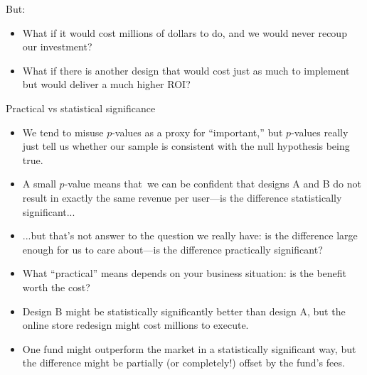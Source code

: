 \documentclass{beamer}\usepackage[]{graphicx}\usepackage[]{color}
\begin{document}
\begin{darkframes}
    \begin{frame}{But:}
      \begin{itemize}[<+->]
        \item What if it would cost millions of dollars to do, and we would never recoup our investment?
        \item What if there is another design that would cost just as much to implement but would deliver a much higher ROI?
      \end{itemize}
    \end{frame}

    \begin{frame}{Practical vs statistical significance}
      \begin{itemize}[<+->]
        \item We tend to misuse $p$-values as a proxy for ``important,'' but $p$-values really just tell us whether our sample is consistent with the null hypothesis being true.
        \item A small $p$-value means that we can be confident that designs A and B do not result in exactly the same revenue per user---is the difference \alert{statistically significant}...
        \item ...but that's not answer to the question we really have: is the difference large enough for us to care about---is the difference \alert{practically significant}?
      \end{itemize}
    \end{frame}

    \begin{frame}
      \begin{itemize}[<+->]
        \item What ``practical'' means depends on your business situation: \alert{is the benefit worth the cost?}
        \item Design B might be statistically significantly better than design A, but the online store redesign might cost millions to execute.
        \item One fund might outperform the market in a statistically significant way, but the difference might be partially (or completely!) offset by the fund's fees.
      \end{itemize}
    \end{frame}
  \end{darkframes}
\end{document}
